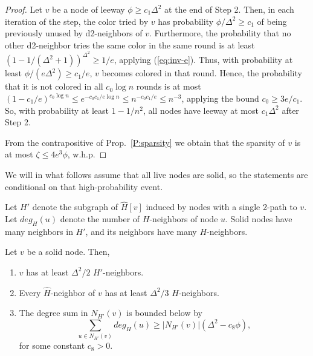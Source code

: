 \begin{proof}
Let $v$ be a node of leeway $\phi \ge c_1 \Delta^2$ at the end of Step 2.
Then, in each iteration of the step, the color tried by $v$ has probability $\phi/\Delta^2 \ge c_1$ of being previously unused by d2-neighbors of $v$. Furthermore, the probability that no other d2-neighbor tries the same color in the same round is at least $(1-1/(\Delta^2+1))^{\Delta^2} \ge 1/e$, applying (\ref{eq:inv-e}). Thus,
with probability at least $\phi/(e \Delta^2) \ge c_1/e$, $v$ becomes colored in that round. Hence, the probability that it is not colored in all $c_0 \log n$ rounds is at most $(1-c_1/e)^{c_0\log n} \le e^{-c_0 c_1/e \log n} \le n^{-c_0 c_1/e} \le n^{-3}$, applying the bound $c_0 \ge 3e/c_1$.
So, with probability at least $1-1/n^2$, all nodes have leeway at most $c_1 \Delta^2$ after Step 2.

From the contrapositive of Prop.~\ref{P:sparsity} we obtain that the sparsity of $v$ is at most $\zeta \le 4e^3 \phi$, w.h.p.
\end{proof}

We will in what follows assume that all live nodes are solid, so the statements are conditional on that high-probability event.

Let $H'$ denote the subgraph of $\hat{H}[v]$ induced by nodes with a single 2-path to $v$.
Let $deg_H(u)$ denote the number of $H$-neighbors of node $u$.
Solid nodes have many neighbors in $H'$, and its neighbors have many $H$-neighbors.
\begin{lemma}
Let $v$ be a solid node.
Then,
\begin{enumerate} 
  \item $v$ has at least $\Delta^2/2$ $H'$-neighbors.
  \item Every $\hat{H}$-neighbor of $v$ has at least $\Delta^2/3$ $H$-neighbors.
  \item The degree sum in $N_{H'}(v)$ is bounded below by
      \[ \sum_{u \in N_{H'}(v)} deg_H(u) \ge |N_{H'}(v)| (\Delta^2 - c_8\phi), \]
     for some constant $c_8 >0$.
\end{enumerate}
\label{L:H-neighbors}
\end{lemma}

